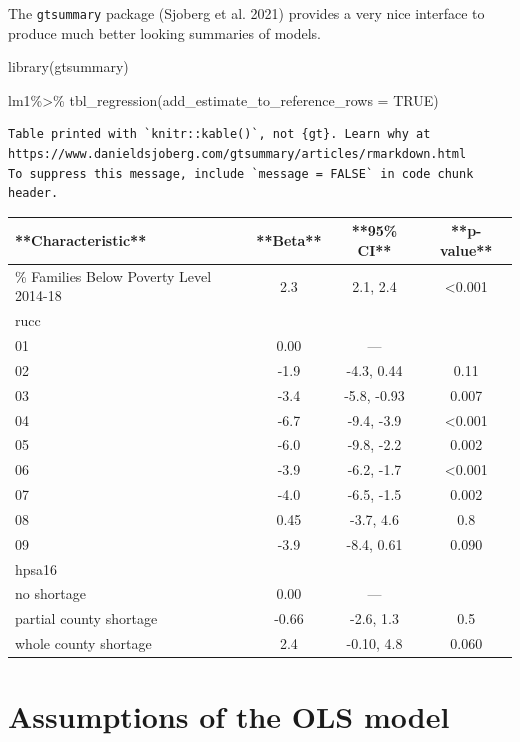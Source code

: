 \documentclass[
  letterpaper,
  DIV=11,
  numbers=noendperiod]{scrreprt}
\newenvironment{Shaded}{\begin{snugshade}}{\end{snugshade}}
\newcommand{\AttributeTok}[1]{\textcolor[rgb]{0.40,0.45,0.13}{#1}}
\newcommand{\ConstantTok}[1]{\textcolor[rgb]{0.56,0.35,0.01}{#1}}
\newcommand{\FunctionTok}[1]{\textcolor[rgb]{0.28,0.35,0.67}{#1}}
\newcommand{\NormalTok}[1]{\textcolor[rgb]{0.00,0.23,0.31}{#1}}
\newcommand{\SpecialCharTok}[1]{\textcolor[rgb]{0.37,0.37,0.37}{#1}}
\begin{document}
The \texttt{gtsummary} package (Sjoberg et al. 2021) provides a very
nice interface to produce much better looking summaries of models.

\begin{Shaded}
\begin{Highlighting}[]
\FunctionTok{library}\NormalTok{(gtsummary)}

\NormalTok{lm1}\SpecialCharTok{\%\textgreater{}\%}
  \FunctionTok{tbl\_regression}\NormalTok{(}\AttributeTok{add\_estimate\_to\_reference\_rows =} \ConstantTok{TRUE}\NormalTok{)}
\end{Highlighting}
\end{Shaded}

\begin{verbatim}
Table printed with `knitr::kable()`, not {gt}. Learn why at
https://www.danieldsjoberg.com/gtsummary/articles/rmarkdown.html
To suppress this message, include `message = FALSE` in code chunk header.
\end{verbatim}

\begin{tabular}{l|c|c|c}
\hline
**Characteristic** & **Beta** & **95\% CI** & **p-value**\\
\hline
\% Families Below Poverty Level 2014-18 & 2.3 & 2.1, 2.4 & <0.001\\
\hline
rucc &  &  & \\
\hline
01 & 0.00 & — & \\
\hline
02 & -1.9 & -4.3, 0.44 & 0.11\\
\hline
03 & -3.4 & -5.8, -0.93 & 0.007\\
\hline
04 & -6.7 & -9.4, -3.9 & <0.001\\
\hline
05 & -6.0 & -9.8, -2.2 & 0.002\\
\hline
06 & -3.9 & -6.2, -1.7 & <0.001\\
\hline
07 & -4.0 & -6.5, -1.5 & 0.002\\
\hline
08 & 0.45 & -3.7, 4.6 & 0.8\\
\hline
09 & -3.9 & -8.4, 0.61 & 0.090\\
\hline
hpsa16 &  &  & \\
\hline
no shortage & 0.00 & — & \\
\hline
partial county shortage & -0.66 & -2.6, 1.3 & 0.5\\
\hline
whole county shortage & 2.4 & -0.10, 4.8 & 0.060\\
\hline
\end{tabular}

\hypertarget{assumptions-of-the-ols-model}{%
\section{Assumptions of the OLS
model}\label{assumptions-of-the-ols-model}}
\end{document}
